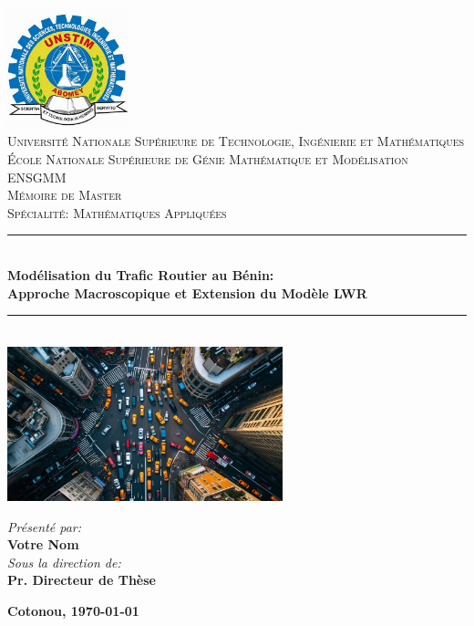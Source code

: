 \begin{titlepage}
\thispagestyle{empty}
\pagecolor{white} %

\begin{center}

\vspace*{-1cm}
\includegraphics[width=3.5cm]{images/logo-university.jpg}\\[0.5cm]

\textsc{\Large Université Nationale Supérieure de Technologie, Ingénierie et Mathématiques}\\[0.3cm]
\textsc{\large École Nationale Supérieure de Génie Mathématique et Modélisation}\\[0.2cm]
\textsc{\large ENSGMM}\\[1.5cm]

\textsc{\large Mémoire de Master}\\
\textsc{\normalsize Spécialité: Mathématiques Appliquées}\\[2cm]

{\color{darkblue}\rule{\textwidth}{1.5pt}}\\[0.45cm]
{\LARGE\bfseries\color{darkblue}Modélisation du Trafic Routier au Bénin:\\[0.2cm]
\large Approche Macroscopique et Extension du Modèle LWR}\\[0.45cm]
{\color{darkblue}\rule{\textwidth}{1.5pt}}\\[1.5cm]

\includegraphics[width=8cm]{images/traffic-graphic.jpg}\\[1.2cm]

\begin{flushright}
\large
\emph{Présenté par:}\\
\textbf{Votre Nom}\\[1cm]
\emph{Sous la direction de:}\\
\textbf{Pr. Directeur de Thèse}\\
\end{flushright}

\vfill

{\large\bfseries Cotonou, \today}

\end{center}
\end{titlepage}
\pagecolor{pagebackground} %
